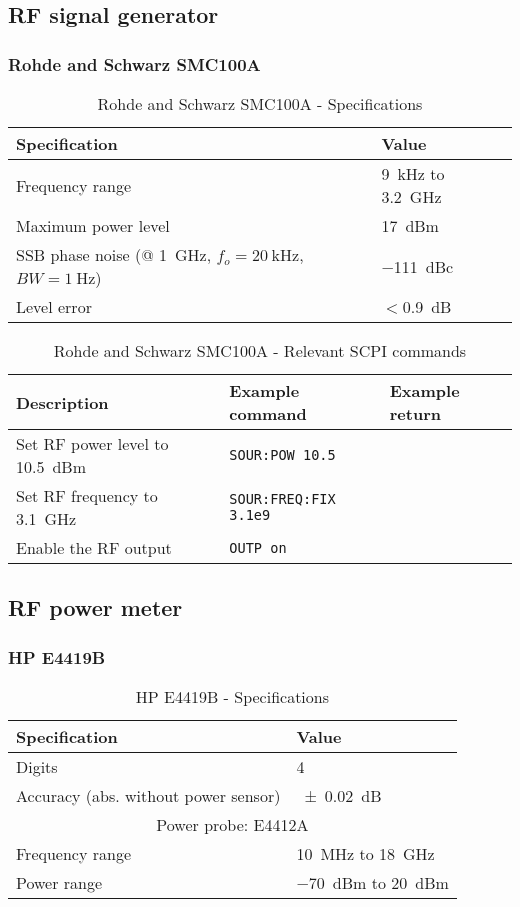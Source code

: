 \subsection{RF signal generator}
\subsubsection{Rohde and Schwarz SMC100A}
\begin{table}[H]
	\centering
	\caption{Rohde and Schwarz SMC100A - Specifications}
	\label{tab:rs-smc100a-specs}
	\begin{tabularx}{\textwidth}{ll}
		\toprule
		\textbf{Specification} & \textbf{Value}\\
		\midrule
		Frequency range & \SI{9}{\kHz} to \SI{3.2}{\GHz}\\
		Maximum power level & \SI{17}{dBm}\\
		SSB phase noise (@ \SI{1}{\GHz}, $f_o=\SI{20}{\kHz}$, $BW=\SI{1}{\Hz}$) & \SI{-111}{dBc}\\
		Level error & $<$\SI{0.9}{\dB}\\
		\bottomrule
	\end{tabularx}
\end{table}

\begin{table}[H]
	\centering
	\caption{Rohde and Schwarz SMC100A - Relevant SCPI commands}
	\label{tab:rs-smc100a-scpi}
	\begin{tabularx}{\textwidth}{Xll}
		\toprule
		\textbf{Description} & \textbf{Example command} & \textbf{Example return}\\
		\midrule
		Set RF power level to \SI{10.5}{dBm} & \texttt{SOUR:POW 10.5} & \\
		Set RF frequency to \SI{3.1}{\GHz}& \texttt{SOUR:FREQ:FIX {3.1e9}} & \\
		Enable the RF output & \texttt{OUTP on} & \\
		\bottomrule
	\end{tabularx}
\end{table}

\subsection{RF power meter}
\subsubsection{HP E4419B}
\begin{table}[H]
	\centering
	\caption{HP E4419B - Specifications}
	\label{tab:hp-E4419B-specs}
	\begin{tabularx}{\textwidth}{ll}
		\toprule
		\textbf{Specification} & \textbf{Value}\\
		\midrule
		Digits & 4\\
		Accuracy (abs. without power sensor) & \SI{+-0.02}{\dB} \\
		\multicolumn{2}{c}{Power probe: E4412A}\\
		Frequency range & \SI{10}{\MHz} to \SI{18}{\GHz}\\
		Power range & \SI{-70}{dBm} to \SI{20}{dBm}\\
		\bottomrule
	\end{tabularx}
\end{table}

